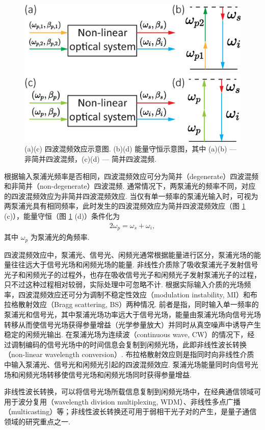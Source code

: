 \documentclass[zh]{assignment}
\begin{document}
\begin{figure}[ht]
    \centering
    \includegraphics[width=.6\columnwidth]{FWM.eps}
    \caption{(a)(c) 四波混频效应示意图. (b)(d) 能量守恒示意图，其中 (a)(b) --- 非简并四波混频，(c)(d) --- 简并四波混频.}
    \label{FWM}
\end{figure}

根据输入泵浦光频率是否相同，四波混频效应可分为简并（degenerate）四波混频和非简并（non-degenerate）四波混频. 通常情况下，两泵浦光的频率不同，对应的四波混频效应为非简并四波混频效应. 当仅有单一频率的泵浦光输入时，可视为两泵浦光具有相同频率，此时发生的四波混频效应为简并四波混频效应（图 \ref{FWM} (c)），能量守恒（图 \ref{FWM} (d)）条件化为
\begin{align}
    2\omega_p=\omega_s+\omega_i,
\end{align}
其中 $\omega_p$ 为泵浦光的角频率.

四波混频效应中，泵浦光、信号光、闲频光通常根据能量进行区分，泵浦光场的能量往往远大于信号光场和闲频光场的能量. 非线性介质除了吸收泵浦光子发射信号光子和闲频光子的过程外，也存在吸收信号光子和闲频光子发射泵浦光子的过程，只不过这种过程相对较弱，实际处理中可忽略不计. 根据实际输入介质的光场频率，四波混频效应还可分为调制不稳定性效应（modulation instability, MI）和布拉格散射效应（Bragg scattering, BS）两种情况. 前者是指，同时输入单一频率的泵浦光和信号光，其中泵浦光场功率远大于信号光场，能量由泵浦光场向信号光场转移从而使信号光场获得参量增益（光学参量放大）并同时从真空噪声中诱导产生稳定的闲频光输出. 在泵浦光场为连续波（continuous wave, CW）的情况下，经过调制编码的信号光场中的时间信息会复制到闲频光场，此即非线性波长转换（non-linear wavelength conversion）. 布拉格散射效应则是指同时向非线性介质中输入泵浦光、信号光和闲频光引起的四波混频效应. 泵浦光场能量同时向信号光场和闲频光场转移使信号光场和闲频光场同时获得参量增益.

非线性波长转换，可以将信号光场所载信息复制到闲频光场中，在经典通信领域可用于波分复用（wavelength division multiplexing, WDM）、非线性多点广播（multicasting）等；非线性波长转换还可用于弱相干光子对的产生，是量子通信领域的研究重点之一.
\end{document}
